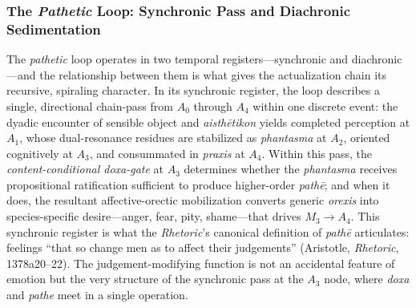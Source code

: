 \documentclass{article}
\begin{document}

\subsubsection*{The \textit{Pathetic} Loop: Synchronic Pass and Diachronic Sedimentation}

The \textit{pathetic} loop operates in two temporal registers---synchronic and diachronic---and the relationship between them is what gives the actualization chain its recursive, spiraling character. In its synchronic register, the loop describes a single, directional chain-pass from $A_0$ through $A_4$ within one discrete event: the dyadic encounter of sensible object and \textit{aisth\=etikon} yields completed perception at $A_1$, whose dual-resonance residues are stabilized as \textit{phantasma} at $A_2$, oriented cognitively at $A_3$, and consummated in \textit{praxis} at $A_4$. Within this pass, the \textit{content-conditional doxa-gate} at $A_3$ determines whether the \textit{phantasma} receives propositional ratification sufficient to produce higher-order \textit{path\=e}; and when it does, the resultant affective-orectic mobilization converts generic \textit{orexis} into species-specific desire---anger, fear, pity, shame---that drives $M_3 \rightarrow A_4$. This synchronic register is what the \textit{Rhetoric}'s canonical definition of \textit{path\=e} articulates: feelings ``that so change men as to affect their judgements'' (Aristotle, \textit{Rhetoric}, 1378a20--22). The judgement-modifying function is not an accidental feature of emotion but the very structure of the synchronic pass at the $A_3$ node, where \textit{doxa} and \textit{pathe} meet in a single operation.
\end{document}
